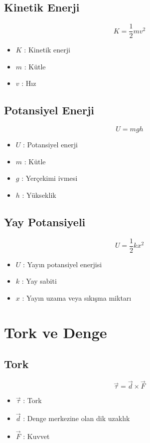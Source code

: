 \documentclass[a4paper, 11pt, titlepage]{article}
\begin{document}
\subsection{Kinetik Enerji}
\[
K = \frac{1}{2} m v^2
\]
\begin{itemize}
  \item $K$ : Kinetik enerji
  \item $m$ : Kütle
  \item $v$ : Hız
\end{itemize}

\subsection{Potansiyel Enerji}
\[
U = m g h
\]
\begin{itemize}
  \item $U$ : Potansiyel enerji
  \item $m$ : Kütle
  \item $g$ : Yerçekimi ivmesi
  \item $h$ : Yükseklik
\end{itemize}

\subsection{Yay Potansiyeli}
\[
U = \frac{1}{2} k x^2
\]
\begin{itemize}
  \item $U$ : Yayın potansiyel enerjisi
  \item $k$ : Yay sabiti
  \item $x$ : Yayın uzama veya sıkışma miktarı
\end{itemize}

\section{Tork ve Denge}



\subsection{Tork}
\[
\vec{\tau} = \vec{d} \times \vec{F}
\]
\begin{itemize}
  \item $\vec{\tau}$ : Tork
  \item $\vec{d}$ : Denge merkezine olan dik uzaklık
  \item $\vec{F}$ : Kuvvet
\end{itemize}
\end{document}

